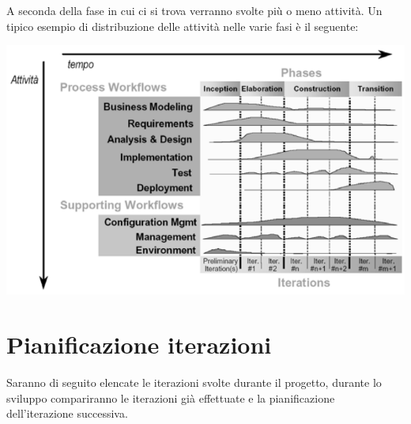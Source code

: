\noindent
A seconda della fase in cui ci si trova verranno svolte più o meno attività. 
Un tipico esempio di distribuzione delle attività nelle varie fasi è il seguente:
\begin{center}
   \includegraphics[width=\textwidth]{assets/fasiworkflow}
\end{center}

\section{Pianificazione iterazioni}
\label{sec:pianificazione_iterazioni}
Saranno di seguito elencate le iterazioni svolte durante il progetto, durante lo sviluppo compariranno le iterazioni già effettuate e la pianificazione dell'iterazione successiva.


\tabitervspace


